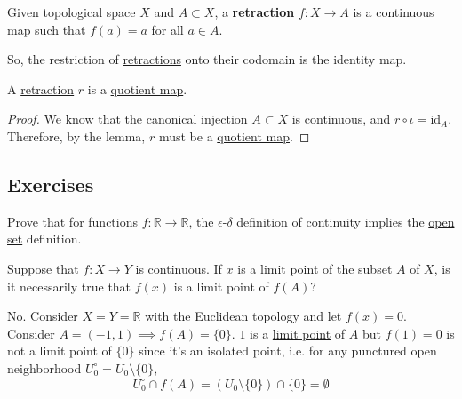   \begin{definition}[Retraction]
		\label{def:retraction}
    Given topological space $X$ and $A \subset X$, a \textbf{retraction} $f: X \to A$ is a continuous map such that $f(a) = a$ for all $a \in A$. 
  \end{definition}

  So, the restriction of \hyperref[def:retraction]{retractions} onto their codomain is the identity map. 

  \begin{theorem}
    \label{thm:retractions-are-quotient-maps}
    A \hyperref[def:retraction]{retraction} $r$ is a \hyperref[def:quotient-map]{quotient map}. 
  \end{theorem}
  \begin{proof}
    We know that the canonical injection $A \subset X$ is continuous, and $r \circ \iota = \mathrm{id}_A$. Therefore, by the lemma, $r$ must be a \hyperref[def:quotient-map]{quotient map}. 
  \end{proof}

\subsection{Exercises}

  \begin{exercise}[Munkres 18.1]
    Prove that for functions $f : \mathbb{R} \to \mathbb{R}$, the $\epsilon$-$\delta$ definition of continuity implies the \hyperref[def:open-set]{open set} definition.
  \end{exercise}

  \begin{exercise}[Munkres 18.2]
    Suppose that $f : X \to Y$ is continuous. If $x$ is a \hyperref[def:limit-point]{limit point} of the subset $A$ of $X$, is it necessarily true that $f(x)$ is a limit point of $f(A)$?
  \end{exercise}
  \begin{solution}
    No. Consider $X = Y = \mathbb{R}$ with the Euclidean topology and let $f(x) = 0$. Consider $A = (-1, 1) \implies f(A) = \{0\}$. $1$ is a \hyperref[def:limit-point]{limit point} of $A$ but $f(1) = 0$ is not a limit point of $\{0\}$ since it's an isolated point, i.e. for any punctured open neighborhood $U_0^\circ = U_0 \setminus \{0\}$, 
    \begin{equation}
      U_0^\circ \cap f(A) = (U_0 \setminus \{0\}) \cap \{0\} = \emptyset
    \end{equation}
  \end{solution}

